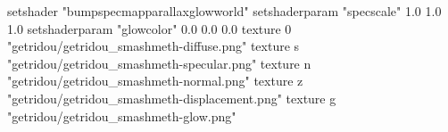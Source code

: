 setshader "bumpspecmapparallaxglowworld"
setshaderparam "specscale" 1.0 1.0 1.0
setshaderparam "glowcolor" 0.0 0.0 0.0
texture 0 "getridou/getridou_smashmeth-diffuse.png"
texture s "getridou/getridou_smashmeth-specular.png"
texture n "getridou/getridou_smashmeth-normal.png"
texture z "getridou/getridou_smashmeth-displacement.png"
texture g "getridou/getridou_smashmeth-glow.png"
